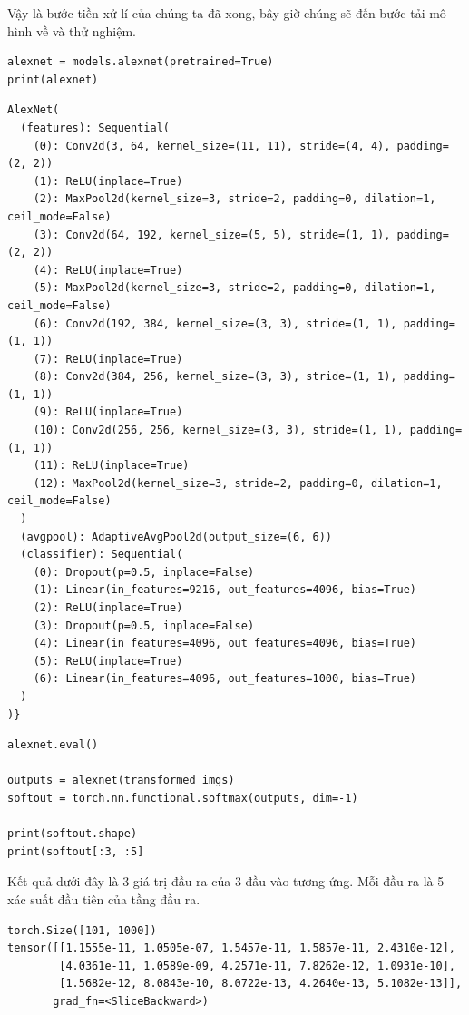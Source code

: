 \documentclass[a4paper]{article}
\begin{document}
Vậy là bước tiền xử lí của chúng ta đã xong, bây giờ chúng sẽ đến bước tải mô hình về và thử nghiệm.
\begin{lstlisting}
alexnet = models.alexnet(pretrained=True)
print(alexnet)
\end{lstlisting}
\begin{verbatim}
AlexNet(
  (features): Sequential(
    (0): Conv2d(3, 64, kernel_size=(11, 11), stride=(4, 4), padding=(2, 2))
    (1): ReLU(inplace=True)
    (2): MaxPool2d(kernel_size=3, stride=2, padding=0, dilation=1, ceil_mode=False)
    (3): Conv2d(64, 192, kernel_size=(5, 5), stride=(1, 1), padding=(2, 2))
    (4): ReLU(inplace=True)
    (5): MaxPool2d(kernel_size=3, stride=2, padding=0, dilation=1, ceil_mode=False)
    (6): Conv2d(192, 384, kernel_size=(3, 3), stride=(1, 1), padding=(1, 1))
    (7): ReLU(inplace=True)
    (8): Conv2d(384, 256, kernel_size=(3, 3), stride=(1, 1), padding=(1, 1))
    (9): ReLU(inplace=True)
    (10): Conv2d(256, 256, kernel_size=(3, 3), stride=(1, 1), padding=(1, 1))
    (11): ReLU(inplace=True)
    (12): MaxPool2d(kernel_size=3, stride=2, padding=0, dilation=1, ceil_mode=False)
  )
  (avgpool): AdaptiveAvgPool2d(output_size=(6, 6))
  (classifier): Sequential(
    (0): Dropout(p=0.5, inplace=False)
    (1): Linear(in_features=9216, out_features=4096, bias=True)
    (2): ReLU(inplace=True)
    (3): Dropout(p=0.5, inplace=False)
    (4): Linear(in_features=4096, out_features=4096, bias=True)
    (5): ReLU(inplace=True)
    (6): Linear(in_features=4096, out_features=1000, bias=True)
  )
)}
\end{verbatim}
\begin{lstlisting}
alexnet.eval()

outputs = alexnet(transformed_imgs)
softout = torch.nn.functional.softmax(outputs, dim=-1)

print(softout.shape)
print(softout[:3, :5]
\end{lstlisting}
Kết quả dưới đây là 3 giá trị đầu ra của 3 đầu vào tương ứng. Mỗi đầu ra là 5 xác suất đầu tiên của tầng đầu ra.
\begin{verbatim}
torch.Size([101, 1000])
tensor([[1.1555e-11, 1.0505e-07, 1.5457e-11, 1.5857e-11, 2.4310e-12],
        [4.0361e-11, 1.0589e-09, 4.2571e-11, 7.8262e-12, 1.0931e-10],
        [1.5682e-12, 8.0843e-10, 8.0722e-13, 4.2640e-13, 5.1082e-13]],
       grad_fn=<SliceBackward>)
\end{verbatim}
\end{document}
